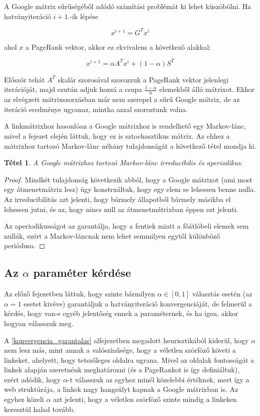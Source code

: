 \documentclass[12pt,a4paper]{article}
\newtheorem{tetel}{Tétel}
\begin{document}
A Google mátrix sűrűségéből adódó számítási problémát ki lehet küszöbölni. Ha hatványiteráció $i+1$.-ik lépése

\[ x^{i+1} = G^T x^i \]

ahol $x$ a PageRank vektor, akkor ez ekvivalens a következő alakkal:

\[ x^{i+1} = \alpha A^T x^i + (1-\alpha) S^T \] 

Először tehát $A^T$ skalár szorosával szorozzuk a PageRank vektor jelenlegi iterációját, majd ezután adjuk hozzá a csupa $\frac{1-\alpha}{n}$ elemekből álló mátrixot. Ekkor az elvégzett mátrixszorzásban már nem szerepel a sűrű Google mátrix, de az iteráció eredménye ugyanaz, mintha azzal szoroztunk volna. 

\vspace{0.2cm}
A linkmátrixhoz hasonlóan a Google mátrixhoz is rendelhető egy Markov-lánc, mivel a fejezet elején láttuk, hogy ez is sztochasztikus mátrix. Az ehhez a mátrixhoz tartozó Markov-lánc néhány tulajdonságát a következő tétel mondja ki.

\begin{tetel}
	A Google mátrixhoz tartozó Markov-lánc irreducibilis és aperiodikus.
\end{tetel}
\vspace{-1cm}
\begin{proof}
	Mindkét tulajdonság következik abból, hogy a Google mátrixot (ami most egy átmenetmátrix lesz) úgy konstruáltuk, hogy egy elem se lehessen benne nulla. Az irreducibilitás azt jelenti, hogy bármely állapotból bármely másikba el lehessen jutni, és az, hogy nincs null az átmenetmátrixban éppen ezt jelenti. 
	
	Az aperiodikusságot az garantálja, hogy a fentiek miatt a főátlóbeli elemek sem nullák, ezért a Markov-láncnak nem lehet semmilyen egytől különböző periódusa.
\end{proof}


\subsection{Az $\alpha$ paraméter kérdése}

Az előző fejezetben láttuk, hogy szinte bármilyen $\alpha \in [0,1]$ választás esetén (az $\alpha=1$ esetet kivéve) garantáljuk a hatványiteráció konvergenciáját, de felmerül a kérdés, hogy van-e egyéb jelentőség ennek a paraméternek, és ha igen, akkor hogyan válasszuk meg.

A \ref{konvergencia_garantalas} alfejezetben megadott heurisztikából kiderül, hogy $\alpha$ nem lesz más, mint annak a valószínűsége, hogy a véletlen szörföző követi a linkeket, ahelyett, hogy tetszőleges oldalra ugrana. Mivel az oldalak fontosságát a linkek alapján szeretnénk meghatározni (és a PageRankot is így definiáltuk), ezért adódik, hogy $\alpha$-t válasszuk az egyhez minél közelebbi értéknek, mert így a web struktúrája, a linkek nagy hangsúlyt kapnak a Google mátrixban is. Az egyhez közeli $\alpha$ azt jelenti, hogy a véletlen szörföző szinte mindig a linkeken keresztül halad tovább.
\end{document}

